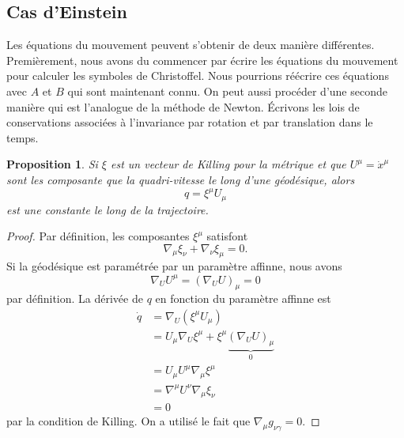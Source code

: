 \documentclass[a4paper,11pt]{report}
\theoremstyle{definition}
\theoremstyle{plain}
\newtheorem{prop}[thm]{Proposition}
\theoremstyle{definition}
\theoremstyle{remark}
\begin{document}
        
        
        \subsection{Cas d'Einstein}
        
            Les équations du mouvement peuvent s'obtenir de deux manière différentes. Premièrement, nous avons du commencer par écrire les équations du mouvement pour calculer les symboles de Christoffel. Nous pourrions réécrire ces équations avec $A$ et $B$ qui sont maintenant connu. On peut aussi procéder d'une seconde manière qui est l'analogue de la méthode de Newton. Écrivons les lois de conservations associées à l'invariance par rotation et par translation dans le temps.
            
            \begin{prop}
                Si $\xi$ est un vecteur de Killing pour la métrique et que $U^\mu = \dot{x}^\mu$ sont les composante que la quadri-vitesse le long d'une géodésique, alors
                \begin{equation}
                    q = \xi^\mu U_\mu
                \end{equation}
                est une constante le long de la trajectoire.
            \end{prop}
            
            \begin{proof}
                Par définition, les composantes $\xi^\mu$ satisfont
                \begin{equation}
                    \nabla_\mu\xi_\nu + \nabla_\nu\xi_\mu = 0.
                \end{equation}
                Si la géodésique est paramétrée par un paramètre affinne, nous avons 
                \begin{equation}
                    \nabla_U U^\mu = (\nabla_U U)_\mu = 0
                \end{equation}
                par définition. La dérivée de $q$ en fonction du paramètre affinne  est
                \begin{align}
                    \dot{q} &= \nabla_U(\xi^\mu U_\mu)\\
                    &= U_\mu\nabla_U \xi^\mu + \xi^\mu\underbrace{(\nabla_U U)_\mu}_{0}\\
                    &= U_\mu U^\mu\nabla_\mu \xi^\mu\\
                    &= \nabla^\mu U^\nu \nabla_\mu \xi_\nu\\
                    &= 0
                \end{align}
                par la condition de Killing. On a utilisé le fait que $\nabla_\mu g_{\nu\gamma} = 0$.
            \end{proof}
            
\end{document}
